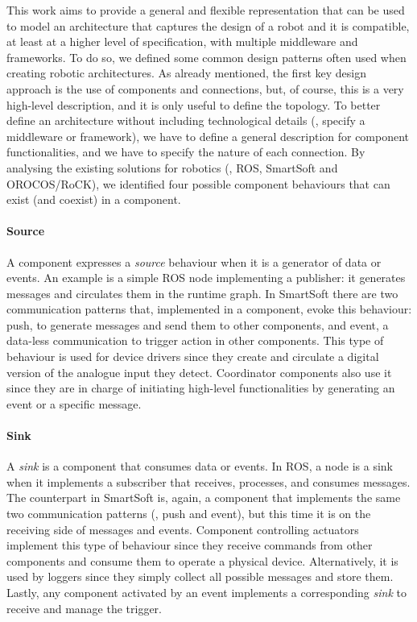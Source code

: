 This work aims to provide a general and flexible representation that can be used to model an architecture that captures the design of a robot and it is compatible, at least at a higher level of specification, with multiple middleware and frameworks. To do so, we defined some common design patterns often used when creating robotic architectures. As already mentioned, the first key design approach is the use of components and connections, but, of course, this is a very high-level description, and it is only useful to define the topology. To better define an architecture without including technological details (\ie, specify a middleware or framework), we have to define a general description for component functionalities, and we have to specify the nature of each connection. By analysing the existing solutions for robotics (\ie, ROS, SmartSoft and OROCOS/RoCK), we identified four possible component behaviours that can exist (and coexist) in a component.

\paragraph{Source} A component expresses a \textit{source} behaviour when it is a generator of data or events. An example is a simple ROS node implementing a publisher: it generates messages and circulates them in the runtime graph. In SmartSoft there are two communication patterns that, implemented in a component, evoke this behaviour: push, to generate messages and send them to other components, and event, a data-less communication to trigger action in other components. This type of behaviour is used for device drivers since they create and circulate a digital version of the analogue input they detect. Coordinator components also use it since they are in charge of initiating high-level functionalities by generating an event or a specific message.

\paragraph{Sink} A \textit{sink} is a component that consumes data or events. In ROS, a node is a sink when it implements a subscriber that receives, processes, and consumes messages. The counterpart in SmartSoft is, again, a component that implements the same two communication patterns (\ie, push and event), but this time it is on the receiving side of messages and events. Component controlling actuators implement this type of behaviour since they receive commands from other components and consume them to operate a physical device. Alternatively, it is used by loggers since they simply collect all possible messages and store them. Lastly, any component activated by an event implements a corresponding \textit{sink} to receive and manage the trigger.

